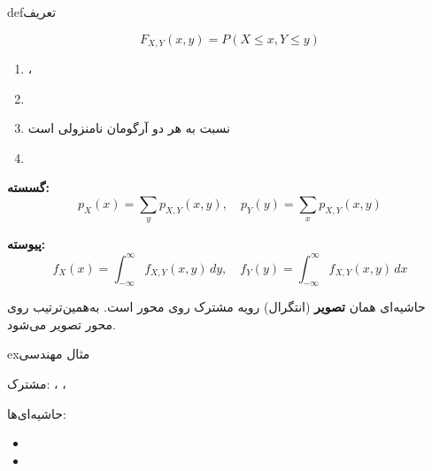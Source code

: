 
\begin{PSbox}[unbreakable]{def}{تعریف}

\[F_{X,Y}(x,y) = P(X \leq x, Y \leq y)\]

\end{PSbox}


\begin{enumerate}
\def\labelenumi{\arabic{enumi}.}
\tightlist
\item
  ، 
\item
\item
  نسبت به هر دو آرگومان نامنزولی است
\item
\end{enumerate}



\textbf{گسسته:}\PSbr{}\[p_X(x) = \sum_y p_{X,Y}(x,y), \quad p_Y(y) = \sum_x p_{X,Y}(x,y)\]

\textbf{پیوسته:}\PSbr{}\[f_X(x) = \int_{-\infty}^{\infty} f_{X,Y}(x,y) \, dy, \quad f_Y(y) = \int_{-\infty}^{\infty} f_{X,Y}(x,y) \, dx\]


 حاشیه‌ای  همان \textbf{تصویر} (انتگرال) رویه مشترک روی محور  است. به‌همین‌ترتیب  روی محور  تصویر می‌شود.

\begin{PSbox}[unbreakable]{ex}{مثال مهندسی}

 مشترک: ، ، 

حاشیه‌ای‌ها:

\begin{itemize}
\tightlist
\item
\item
\end{itemize}

\end{PSbox}

